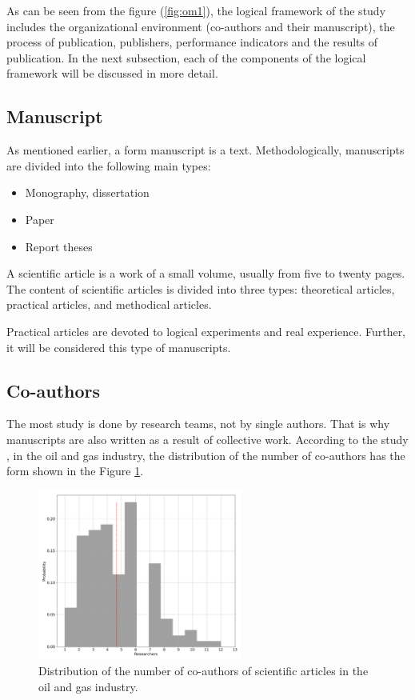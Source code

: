 \documentclass[12pt]{report}
\theoremstyle{definition}
\providecommand{\tightlist}{%
	\setlength{\itemsep}{0pt}\setlength{\parskip}{0pt}}
\begin{document}
As can be seen from the figure (\ref{fig:om1}), the logical framework of the study includes the organizational environment (co-authors and their manuscript), the process of publication, publishers, performance indicators and the results of publication. 
In the next subsection, each of the components of the logical framework will be discussed in more detail.

\subsection{Manuscript}
As mentioned earlier, a form manuscript is a text.
Methodologically, manuscripts are divided into the following main types:

\begin{itemize}
	\tightlist
	\item Monography, dissertation
	\item Paper 
	\item Report theses
\end{itemize}

A scientific article is a work of a small volume, usually from five to twenty pages. 
The content of scientific articles is divided into three types: theoretical articles,  practical articles, and methodical articles. 

Practical articles are devoted to logical experiments and real experience. 
Further, it will be considered this type of manuscripts.

\subsection{Co-authors}
The most study is done by research teams, not by single authors. 
That is why manuscripts are also written as a result of collective work.
According to the study \cite{kradoya2016structure}, in the oil and gas industry, the distribution of the number of co-authors has the form shown in the Figure \ref{fig:om2}.

\begin{figure}[ht]
	\centering
	\includegraphics[width=0.6\textwidth]{om2}
	\caption{Distribution of the number of co-authors of scientific articles in the oil and gas industry.}
	\label{fig:om2}
\end{figure}  
\end{document}
